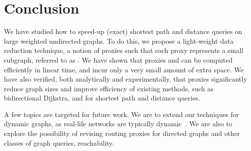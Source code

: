 \section{Conclusion}
\label{sec-con}

We have studied how to speed-up (exact)  shortest path and distance queries on large weighted undirected graphs.
To do this, we  propose  a light-weight data reduction technique, a notion of proxies such that each proxy represents a small subgraph, referred to as \dras. We have shown that
proxies and \dras can be computed efficiently in linear time, and incur only a very small amount of extra space.  We have also verified,
both analytically and experimentally, that proxies significantly reduce graph sizes and improve efficiency of existing methods, such as bidirectional Dijkstra, \arcflag and  \tnr for shortest path and distance queries.

A few topics are targeted for future work.
%
%
We are to extend our techniques for dynamic graphs, as real-life networks are typically dynamic~\cite{fcs-biggraph}.
%
%
We are also to explore the possibility of revising routing proxies for directed graphs and other classes of graph queries, \eg reachability.
